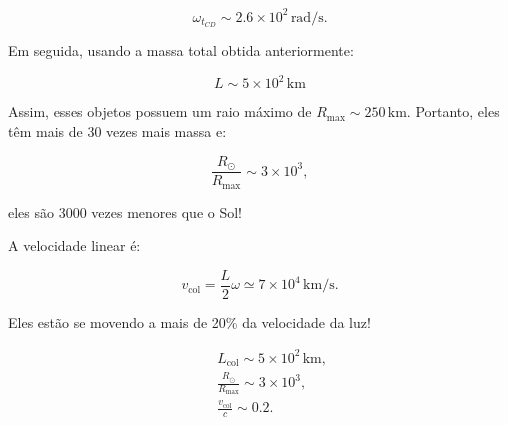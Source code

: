 \documentclass[11pt]{article}
\begin{document}
\begin{pproblem}
\begin{pssolution*}{}{}
\begin{alternativas}
        \[
        \omega_{t_{CD}} \sim 2.6 \times 10^2 \, \text{rad/s}.
        \]
        
        Em seguida, usando a massa total obtida anteriormente:
        
        \[
        L \sim 5 \times 10^2 \, \text{km}
        \]
        
        Assim, esses objetos possuem um raio máximo de $R_{\text{max}} \sim 250 \, \text{km}$. Portanto, eles têm mais de 30 vezes mais massa e:
        
        \[
        \frac{R_\odot}{R_{\text{max}}} \sim 3 \times 10^3,
        \]
        
        eles são 3000 vezes menores que o Sol!
        
        A velocidade linear é:
        
        \[
        v_{\text{col}} = \frac{L}{2} \omega \simeq 7 \times 10^4 \, \text{km/s}. 
        \]
        
        Eles estão se movendo a mais de 20\% da velocidade da luz!
        
        \[
        \boxed{
        \begin{aligned}
        \quad & L_{\text{col}} \sim 5 \times 10^2 \, \text{km}, \\
        & \frac{R_\odot}{R_{\text{max}}} \sim 3 \times 10^3, \\
        & \frac{v_{\text{col}}}{c} \sim 0.2.
        \end{aligned}
        }
        \]
    \end{alternativas}
    
\end{pssolution*}
\end{pproblem}
\end{document}
